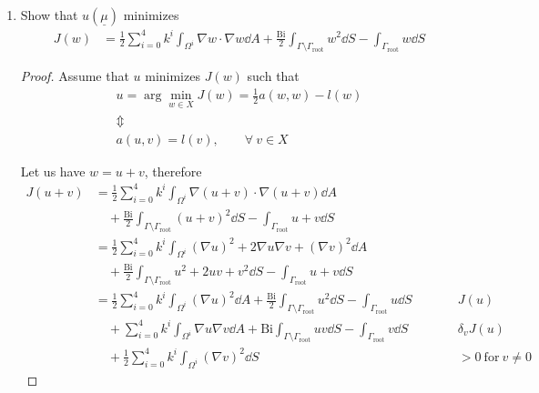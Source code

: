 \begin{enumerate}[label=(\alph*),leftmargin=*,itemsep=0mm]
\begin{proof}
    Or, rewritten
    \begin{align}
        \sum_{i=0}^4 k^i \int_{\Omega^i} \nabla v \cdot \nabla u \dd{A}
        + \text{Bi} \int_{\Gamma\setminus\Gamma_\text{root}} u v \dd{S}
        = \int_{\Gamma_\text{root}} v \dd{S}
    \end{align}
    
    Therefore, we see that Eqns. (5) and (6) are satisfied.
    
    \end{proof}
    
    \item Show that $u(\underline{\mu})$ minimizes
    \begin{align}
        J(w) &= \frac{1}{2}\sum_{i=0}^4 k^i \int_{\Omega^i} \nabla w\cdot \nabla w \dd{A}
        + \frac{\text{Bi}}{2} \int_{\Gamma\setminus\Gamma_\text{root}} w^2 \dd{S}
        - \int_{\Gamma_\text{root}} w \dd{S}
    \end{align}
    
    \begin{proof}
    
    Assume that $u$ minimizes $J(w)$ such that
    \begin{gather*}
        u = \arg\min_{w\in X}J(w) = \frac{1}{2}a(w,w) - l(w) \\
        \Updownarrow \\
        a(u,v) = l(v), \qquad \forall\>v\in X
    \end{gather*}
    
    Let us have $w = u + v$, therefore
    \begin{align}
        J(u+v) &= \frac{1}{2} \sum_{i=0}^4 k^i \int_{\Omega^i} \nabla(u+v) \cdot \nabla(u+v) \dd{A} \nonumber \\
        &\quad + \frac{\text{Bi}}{2} \int_{\Gamma\setminus\Gamma_\text{root}} (u+v)^2 \dd{S}
        - \int_{\Gamma_\text{root}} u+v \dd{S} \nonumber \\
        &= \frac{1}{2} \sum_{i=0}^4 k^i
        \int_{\Omega^i} (\nabla u)^2 + 2\nabla u \nabla v + (\nabla v)^2 \dd{A} \nonumber \\
        &\quad + \frac{\text{Bi}}{2} \int_{\Gamma\setminus\Gamma_\text{root}} u^2 + 2uv + v^2 \dd{S}
        - \int_{\Gamma_\text{root}} u+v \dd{S} \nonumber \\
        &= \frac{1}{2} \sum_{i=0}^4 k^i \int_{\Omega^i} (\nabla u)^2 \dd{A}
        + \frac{\text{Bi}}{2} \int_{\Gamma\setminus\Gamma_\text{root}} u^2 \dd{S}
        - \int_{\Gamma_\text{root}} u \dd{S} &&\qquad J(u) \nonumber \\
        &\quad + \sum_{i=0}^4 k^i \int_{\Omega^i} \nabla u\nabla v \dd{A}
        + \text{Bi} \int_{\Gamma\setminus\Gamma_\text{root}} uv \dd{S}
        - \int_{\Gamma_\text{root}} v \dd{S} &&\qquad \delta_vJ(u) \nonumber \\
        &\quad + \frac{1}{2} \sum_{i=0}^4 k^i \int_{\Omega^i} (\nabla v)^2 \dd{S} &&\qquad > 0 \>\text{for}\> v\neq 0
    \end{align}
    

\end{proof}
\end{enumerate}

